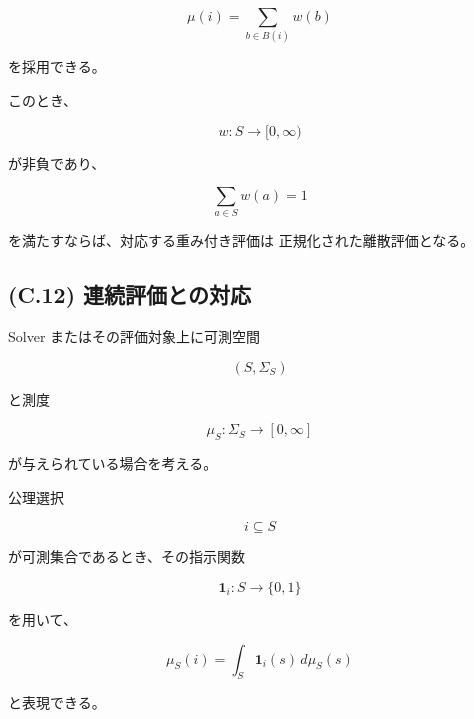 \documentclass[a4paper,11pt]{article}
\begin{document}
\begin{equation}
    \boxed{
        \mu(i)
        =
        \sum_{b\in B(i)}
        w(b)
    }
    \label{eq:C-discrete-measure}
\end{equation}

を採用できる。

このとき、

\begin{equation}
    w:S\to[0,\infty)
\end{equation}

が非負であり、

\begin{equation}
    \sum_{a\in S}w(a)
    =
    1
\end{equation}

を満たすならば、対応する重み付き評価は
正規化された離散評価となる。


\subsection{(C.12) 連続評価との対応}
\label{subsec:C12}

Solver またはその評価対象上に可測空間

\begin{equation}
    (S,\Sigma_S)
\end{equation}

と測度

\begin{equation}
    \mu_S:\Sigma_S\to[0,\infty]
\end{equation}

が与えられている場合を考える。

公理選択

\begin{equation}
    i\subseteq S
\end{equation}

が可測集合であるとき、その指示関数

\begin{equation}
    \mathbf 1_i:S\to\{0,1\}
\end{equation}

を用いて、

\begin{equation}
    \boxed{
        \mu_S(i)
        =
        \int_S
        \mathbf 1_i(s)\,d\mu_S(s)
    }
    \label{eq:C-continuous-measure}
\end{equation}

と表現できる。
\end{document}
